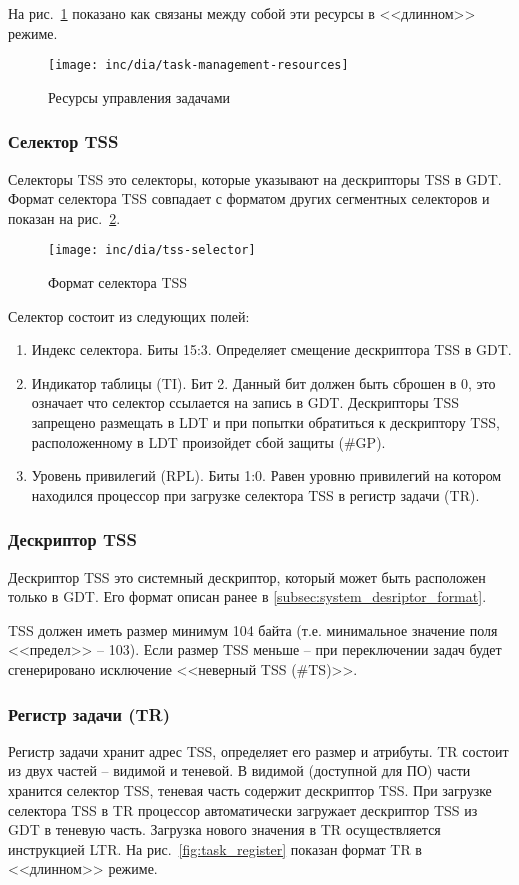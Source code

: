 На рис.~\ref{fig:task_management_resources} показано как связаны между собой
эти ресурсы в <<длинном>> режиме.
\begin{figure}
  \centering
  \texttt{[image: inc/dia/task-management-resources]}
  \caption{Ресурсы управления задачами}
  \label{fig:task_management_resources}
\end{figure}

\subsubsection*{Селектор TSS}
Селекторы TSS это селекторы, которые указывают на дескрипторы TSS в GDT.
Формат селектора TSS совпадает с форматом других сегментных селекторов и
показан на рис.~\ref{fig:tss_selector}.

\begin{figure}
  \centering
  \texttt{[image: inc/dia/tss-selector]}
  \caption{Формат селектора TSS}
  \label{fig:tss_selector}
\end{figure}

Селектор состоит из следующих полей:
\begin{enumerate}
\item Индекс селектора. Биты 15:3. Определяет смещение дескриптора TSS в GDT.
\item Индикатор таблицы (TI). Бит 2. Данный бит должен быть сброшен в 0, это
	означает что селектор ссылается на запись в GDT. Дескрипторы TSS
	запрещено размещать в LDT и при попытки обратиться к дескриптору TSS,
	расположенному в LDT произойдет сбой защиты (\#GP).
\item Уровень привилегий (RPL). Биты 1:0. Равен уровню привилегий на котором
	находился процессор при загрузке селектора TSS в регистр задачи (TR).
\end{enumerate}

\subsubsection*{Дескриптор TSS}
Дескриптор TSS это системный дескриптор, который может быть расположен только
в GDT. Его формат описан ранее в \ref{subsec:system_desriptor_format}.

TSS должен иметь размер минимум 104 байта (т.е. минимальное значение поля <<предел>> -- 103).
Если размер TSS меньше -- при переключении задач будет сгенерировано
исключение <<неверный TSS (\#TS)>>.

\subsubsection*{Регистр задачи (TR)}
Регистр задачи хранит адрес TSS, определяет его размер и атрибуты. TR состоит
из двух частей -- видимой и теневой. В видимой (доступной для ПО) части хранится селектор TSS,
теневая часть содержит дескриптор TSS. При загрузке селектора TSS в TR
процессор автоматически загружает дескриптор TSS из GDT в теневую часть.
Загрузка нового значения в TR осуществляется инструкцией LTR. На
рис.~\ref{fig:task_register} показан формат TR в <<длинном>> режиме.

